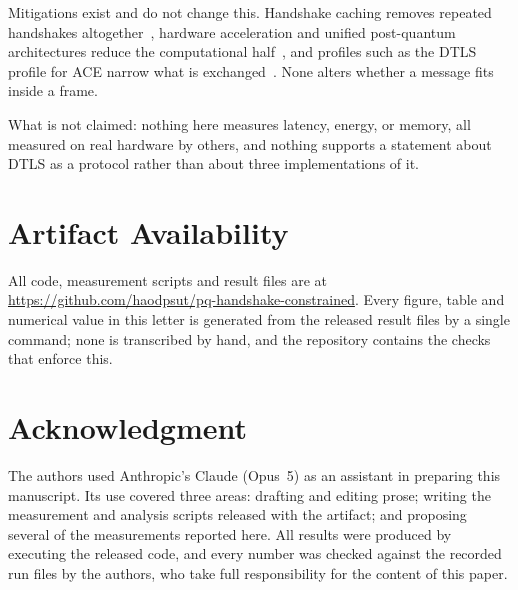 \documentclass[journal]{IEEEtran}
\begin{document}
Mitigations exist and do not change this. Handshake caching removes repeated handshakes
altogether~\cite{bodenhausen2025}, hardware acceleration and unified post-quantum
architectures reduce the computational half~\cite{batmaz2024,dobias2025}, and profiles such as
the DTLS profile for ACE narrow what is exchanged~\cite{rfc9430}. None alters whether a
message fits inside a frame.

What is not claimed: nothing here measures latency, energy, or memory, all measured on real
hardware by others, and nothing supports a statement about DTLS as a protocol rather than
about three implementations of it.

\section*{Artifact Availability}

All code, measurement scripts and result files are at
\url{https://github.com/haodpsut/pq-handshake-constrained}. Every figure, table and numerical
value in this letter is generated from the released result files by a single command; none is
transcribed by hand, and the repository contains the checks that enforce this.

\section*{Acknowledgment}

The authors used Anthropic's Claude (Opus~5) as an assistant in preparing this manuscript.
Its use covered three areas: drafting and editing prose; writing the measurement and analysis
scripts released with the artifact; and proposing several of the measurements reported here.
All results were produced by executing the released code, and every number was checked against
the recorded run files by the authors, who take full responsibility for the content of this
paper.



\end{document}
